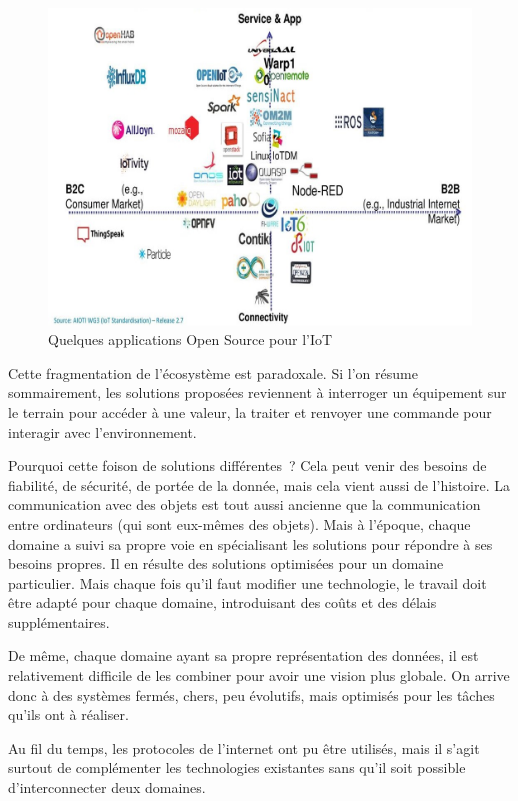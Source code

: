 \begin{figure}[tbp]
\centerline{\includegraphics[width=1\columnwidth]{Pictures/IOTBazar_OpenSources.jpeg}}
\caption{Quelques applications Open Source pour l'IoT}
\label{fig-bazar-OS}
\end{figure}

Cette fragmentation de l’écosystème est paradoxale. Si l’on résume sommairement, les solutions proposées reviennent à interroger un équipement sur le terrain pour accéder à une valeur, la traiter et renvoyer une commande pour interagir avec l’environnement.

Pourquoi cette foison de solutions différentes~? Cela peut venir des besoins de fiabilité, de sécurité, de portée de la donnée, mais cela vient aussi de l’histoire. La communication avec des objets est tout aussi ancienne que la communication entre ordinateurs (qui sont eux-mêmes des objets). Mais à l’époque, chaque domaine a suivi sa propre voie en spécialisant les solutions pour répondre à ses besoins propres. Il en résulte des solutions optimisées pour un domaine particulier. Mais chaque fois qu’il faut modifier une technologie, le travail doit être adapté pour chaque domaine, introduisant des coûts et des délais supplémentaires.

De même, chaque domaine ayant sa propre représentation des données, il est relativement difficile de les combiner pour avoir une vision plus globale. On arrive donc à des systèmes fermés, chers, peu évolutifs, mais optimisés pour les tâches qu’ils ont à réaliser.

Au fil du temps, les protocoles de l’internet ont pu être utilisés, mais il s’agit surtout de complémenter les technologies existantes sans qu’il soit possible d’interconnecter deux domaines.


